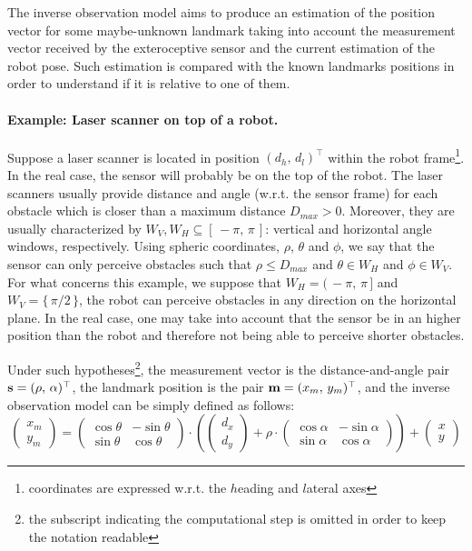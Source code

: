 	The inverse observation model aims to produce an estimation of the position vector for some maybe-unknown landmark taking into account the measurement vector received by the exteroceptive sensor and the current estimation of the robot pose.
	Such estimation is compared with the known landmarks positions in order to understand if it is relative to one of them.
	
	\paragraph{Example: Laser scanner on top of a robot.}
		Suppose a laser scanner is located in position $(d_h,\,d_l)^\top$ within the robot frame\footnote{coordinates are expressed w.r.t. the $h$eading and $l$ateral axes}.
		In the real case, the sensor will probably be on the top of the robot.
		The laser scanners usually provide distance and angle (w.r.t. the sensor frame) for each obstacle which is closer than a maximum distance $D_{max} > 0$.
		Moreover, they are usually characterized by $W_{V},W_{H} \subseteq [\,-\pi,\, \pi\,]$: vertical and horizontal angle windows, respectively.
		Using spheric coordinates, $\rho$, $\theta$ and $\phi$, we say that the sensor can only perceive obstacles such that $\rho \leq D_{max}$ and $\theta \in W_{H}$ and $\phi \in W_{V}$.
		For what concerns this example, we suppose that $W_H = (\,-\pi,\, \pi\,]$ and $W_V = \{\, \pi / 2 \,\}$, \ie{} the robot can perceive obstacles in any direction on the horizontal plane.
		In the real case, one may take into account that the sensor be in an higher position than the robot and therefore not being able to perceive shorter obstacles.
		
		Under such hypotheses\footnote{\label{sec.models.subscript}the subscript indicating the computational step is omitted in order to keep the notation readable}, the measurement vector is the distance-and-angle pair $\boldsymbol{\mathrm{{s}}} = (\rho,\, \alpha)^\top$, the landmark position is the pair $\boldsymbol{\mathrm{{m}}} = (x_m,\, y_m)^\top$, and the inverse observation model can be simply defined as follows:
		\begin{equation}
			\label{eq.inv_observation.laser}
			\left(\begin{array}{c}
				x_m \\ y_m
			\end{array}\right)
			=
			\left(\begin{array}{ccc}
				\cos{\theta} & -\sin{\theta} \\
				\sin{\theta} & \cos{\theta}
			\end{array}\right)
			\cdot
			\left(
				\left(\begin{array}{c}
					d_x \\ d_y
				\end{array}\right)
				+ \rho \cdot
				\left(\begin{array}{cc}
					\cos{\alpha} & -\sin{\alpha} \\
					\sin{\alpha} & \cos{\alpha}
				\end{array}\right)
			\right)
			+
			\left(\begin{array}{c}
				x \\ y
			\end{array}\right)
		\end{equation}
		
